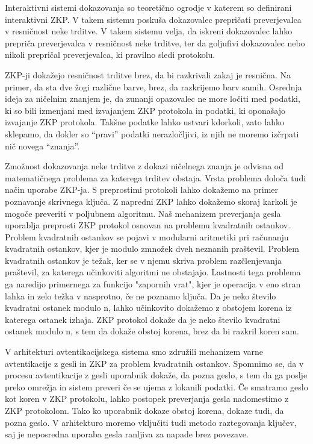 Interaktivni sistemi dokazovanja so teoretično ogrodje v katerem so definirani interaktivni ZKP. V takem sistemu poskuša dokazovalec prepričati preverjevalca v resničnost neke trditve. 
V takem sistemu velja, da iskreni dokazovalec lahko prepriča preverjevalca v resničnost neke trditve, ter da goljufivi dokazovalec nebo nikoli prepričal preverjevalca, ki pravilno sledi protokolu.

ZKP-ji dokažejo resničnost trditve brez, da bi razkrivali zakaj je resnična. 
Na primer, da sta dve žogi različne barve, brez, da razkrijemo barv samih.
Osrednja ideja za ničelnim znanjem je, da zunanji opazovalec ne more ločiti med podatki, ki so bili izmenjani med izvajanjem ZKP protokola in podatki, ki oponašajo izvajanje ZKP protokola.
Takšne podatke lahko ustvari kdorkoli, zato lahko sklepamo, da dokler so “pravi” podatki nerazločljivi, iz njih ne moremo izčrpati nič novega “znanja”.

Zmožnost dokazovanja neke trditve z dokazi ničelnega znanja je odvisna od matematičnega problema za katerega trditev obstaja.
Vrsta problema določa tudi način uporabe ZKP-ja. S preprostimi protokoli lahko dokažemo na primer poznavanje skrivnega ključa. 
Z napredni ZKP lahko dokažemo skoraj karkoli je mogoče preveriti v poljubnem algoritmu.
Naš mehanizem preverjanja gesla uporablja preprosti ZKP protokol osnovan na problemu kvadratnih ostankov.
Problem kvadratnih ostankov se pojavi v modularni aritmetiki pri računanju kvadratnih ostankov, kjer je modulo zmnožek dveh neznanih praštevil.
Problem kvadratnih ostankov je težak, ker se v njemu skriva problem razčlenjevanja praštevil, za katerega učinkoviti algoritmi ne obstajajo.
Lastnosti tega problema ga naredijo primernega za funkcijo "zapornih vrat", kjer je operacija v eno stran lahka in zelo težka v nasprotno, če ne poznamo ključa. 
Da je neko število kvadratni ostanek modulo n, lahko učinkovito dokažemo z obstojem korena iz katerega ostanek izhaja. 
ZKP protokol dokaže da je neko število kvadratni ostanek modulo n, s tem da dokaže obstoj korena, brez da bi razkril koren sam.


V arhitekturi avtentikacijskega sistema smo združili mehanizem varne avtentikacije z gesli in ZKP za problem kvadratnih ostankov.
Spomnimo se, da v procesu avtentikacije z gesli uporabnik dokaže, da pozna geslo, s tem da ga poslje preko omrežja in sistem preveri če se ujema z lokanili podatki.
Če smatramo geslo kot koren v ZKP protokolu, lahko postopek preverjanja gesla nadomestimo z ZKP protokolom.
Tako ko uporabnik dokaze obstoj korena, dokaze tudi, da pozna geslo.
V arhitekturo moremo vključiti tudi metodo raztegovanja ključev, saj je neposredna uporaba gesla ranljiva za napade brez povezave.

